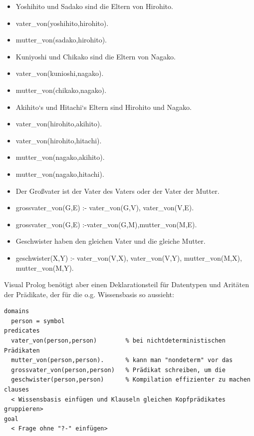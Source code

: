 \documentclass[a4paper]{article}
\begin{document}
\begin{multicols}{3}
  \begin{itemize}
    \itemsep1pt\parskip0pt
    \item
          Yoshihito und Sadako sind die Eltern von Hirohito.
    \item
          vater\_von(yoshihito,hirohito).
    \item
          mutter\_von(sadako,hirohito).
    \item
          Kuniyoshi und Chikako sind die Eltern von Nagako.
    \item
          vater\_von(kunioshi,nagako).
    \item
          mutter\_von(chikako,nagako).
    \item
          Akihito`s und Hitachi`s Eltern sind Hirohito und Nagako.
    \item
          vater\_von(hirohito,akihito).
    \item
          vater\_von(hirohito,hitachi).
    \item
          mutter\_von(nagako,akihito).
    \item
          mutter\_von(nagako,hitachi).
    \item
          Der Großvater ist der Vater des Vaters oder der Vater der Mutter.
    \item
          grossvater\_von(G,E) :- vater\_von(G,V), vater\_von(V,E).
    \item
          grossvater\_von(G,E) :-vater\_von(G,M),mutter\_von(M,E).
    \item
          Geschwister haben den gleichen Vater und die gleiche Mutter.
    \item
          geschwister(X,Y) :- vater\_von(V,X), vater\_von(V,Y),
          mutter\_von(M,X), mutter\_von(M,Y).
  \end{itemize}

  Visual Prolog benötigt aber einen Deklarationsteil für Datentypen und
  Aritäten der Prädikate, der für die o.g. Wissensbasis so aussieht:

  \begin{verbatim}
domains
  person = symbol
predicates
  vater_von(person,person)        % bei nichtdeterministischen Prädikaten
  mutter_von(person,person).      % kann man "nondeterm" vor das
  grossvater_von(person,person)   % Prädikat schreiben, um die
  geschwister(person,person)      % Kompilation effizienter zu machen
clauses
  < Wissensbasis einfügen und Klauseln gleichen Kopfprädikates gruppieren>
goal
  < Frage ohne "?-" einfügen>
\end{verbatim}


\end{multicols}
\end{document}
